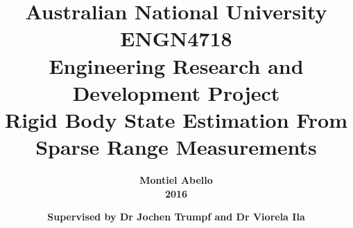 \documentclass[oneside,openany,11pt]{book}
\begin{document}
\begin{titlepage}
\title{
	\normalsize
		\textbf{Australian National University}\\[0.5cm]
		\textbf{ENGN4718}\\
	 	\textbf{Engineering Research and Development Project}\\[2cm]
	\LARGE
		\textbf{Rigid Body State Estimation From Sparse Range Measurements}\\[2cm]}
\author{
	\textbf{Montiel Abello}\\
	\textbf{2016}}
\date{
	\textbf{Supervised by Dr Jochen Trumpf and Dr Viorela Ila}}
\maketitle
\end{titlepage}
\restoregeometry

\frontmatter


\tableofcontents
%
\listoffigures


\mainmatter

%




 




%
\end{document}
